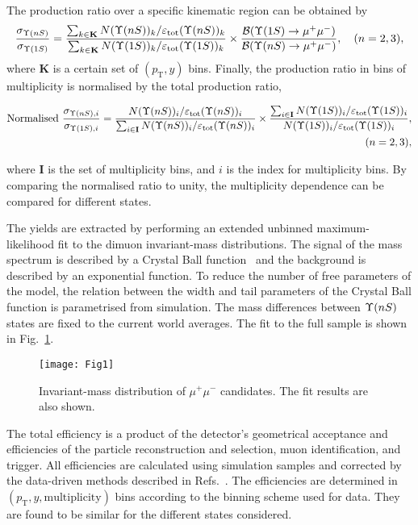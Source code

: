 \documentclass[12pt,a4paper]{article}
\def\Pmu         {\ensuremath{\upmu}\xspace}
\def\Pmu         {\ensuremath{\mu}\xspace}
\def\mumu       {{\ensuremath{\Pmu^+\Pmu^-}}\xspace}
\def\BF         {{\ensuremath{\mathcal{B}}}\xspace}
\def\BR         {\BF}
\def\to                 {\ensuremath{\rightarrow}\xspace}
\newcommand{\etot}{{\ensuremath{\varepsilon_{\mathrm{ tot}}}}\xspace}
\def\pt         {\ensuremath{p_{\mathrm{T}}}\xspace}
\begin{document}
The production ratio over a specific kinematic region can be obtained by
\begin{equation}
\label{eq:intsxec}
\frac{\sigma_{\Yn{n}}}{\sigma_{\Yn{1}}}
 = \frac{\sum_{k\in \mathbf{K}}N(\Yn{n})_k/\etot(\Yn{n})_k}{\sum_{k\in \mathbf{K}}N(\Yn{1})_k/\etot(\Yn{1})_k} \times  \frac {\BR(\Yn{1}\to\mumu)}{\BR(\Yn{n}\to\mumu)}, \quad(n=2,3),
\end{equation}
where $\mathbf{K}$ is a certain set of $(\pt,y)$ bins. Finally, the production ratio in bins of multiplicity is normalised by the total production ratio,
\begin{small}
\begin{equation}
\begin{aligned}
\text{Normalised} \ \frac{\sigma_{\Yn{n},i}}{\sigma_{\Yn{1},i}}
=\frac{N(\Yn{n})_i/\etot(\Yn{n})_i}{\sum_{i\in \mathbf{I}}N(\Yn{n})_i/\etot(\Yn{n})_i}\times\frac{\sum_{i\in \mathbf{I}}N(\Yn{1})_i/\etot(\Yn{1})_i}{N(\Yn{1})_i/\etot(\Yn{1})_i},\\
 \quad(n=2,3),
\end{aligned}
\end{equation}
\end{small}

\noindent where $\mathbf{I}$ is the set of multiplicity bins, and $i$ is the index for multiplicity bins. By comparing the normalised ratio to unity, the multiplicity dependence can be compared for different states. 

The yields are extracted by performing an extended unbinned maximum-likelihood fit to the dimuon invariant-mass distributions. The signal of the mass spectrum is described by a Crystal Ball function~\cite{Skwarnicki:1986xj} and the background is described by an exponential function. To reduce the number of free parameters of the model, the relation between the width and tail parameters of the Crystal Ball function is parametrised from simulation. The mass differences between $\Upsilon{(nS)}$ states are fixed to the current world averages\cite{PDG2024}. The fit to the full sample is shown in Fig.~\ref{fig:dimuonmass}. 
\begin{figure}[!tbp]
\centering
\begin{minipage}[t]{0.7\textwidth}
\centering
\texttt{[image: Fig1]}
\end{minipage}
\caption{Invariant-mass distribution of 
$\mu^+\mu^-$ candidates. The fit results are also shown.}
\label{fig:dimuonmass}
\end{figure}

The total efficiency is a product of the detector's geometrical acceptance and efficiencies of the particle reconstruction and selection, muon identification, and trigger. 
All efficiencies are calculated using simulation samples and corrected by the data-driven methods described in Refs.~\cite{Anderlini:2202412,LHCb-DP-2013-002}. 
The efficiencies are determined in $(\pt,y, \text{multiplicity})$ bins according to the binning scheme used for data. They are found to be similar for the different  states considered.
\end{document}
